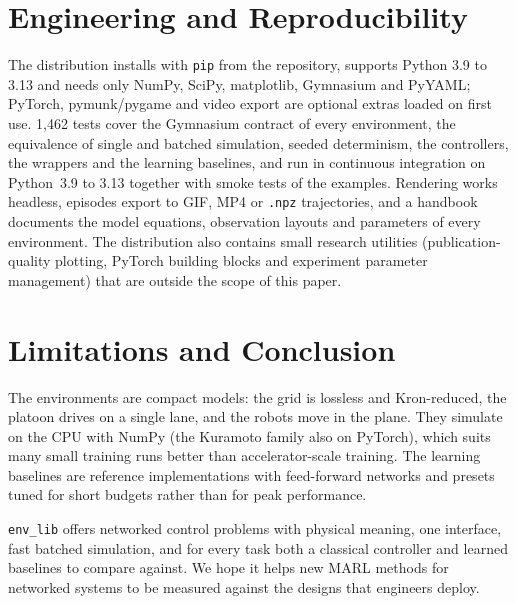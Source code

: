 \documentclass{article}
\newcommand{\NumTests}{1{,}462}
\newcommand{\code}[1]{\texttt{#1}}
\begin{document}
\section{Engineering and Reproducibility}\label{sec:engineering}

The distribution installs with \code{pip} from the repository, supports
Python 3.9 to 3.13 and needs only NumPy, SciPy, matplotlib, Gymnasium and
PyYAML; PyTorch, pymunk/pygame
and video export are optional extras loaded on first use. {\NumTests} tests
cover the Gymnasium contract of every environment, the equivalence of single
and batched simulation, seeded determinism, the controllers, the wrappers and
the learning baselines, and run in continuous integration on Python~3.9 to
3.13 together with smoke tests of the examples. Rendering works headless,
episodes export to GIF, MP4 or \code{.npz} trajectories, and a handbook
documents the model equations, observation layouts and parameters of every
environment. The distribution also contains small research utilities
(publication-quality plotting, PyTorch building blocks and experiment
parameter management) that are outside the scope of this paper.

\section{Limitations and Conclusion}

The environments are compact models: the grid is lossless and Kron-reduced,
the platoon drives on a single lane, and the robots move in the plane. They
simulate on the CPU with NumPy (the Kuramoto family also on PyTorch), which
suits many small training runs better than accelerator-scale training. The
learning baselines are reference implementations with feed-forward networks
and presets tuned for short budgets rather than for peak performance.

\texttt{env\_lib} offers networked control problems with physical meaning, one
interface, fast batched simulation, and for every task both a classical
controller and learned baselines to compare against. We hope it helps new
MARL methods for networked systems to be measured against the designs that
engineers deploy.
\end{document}

